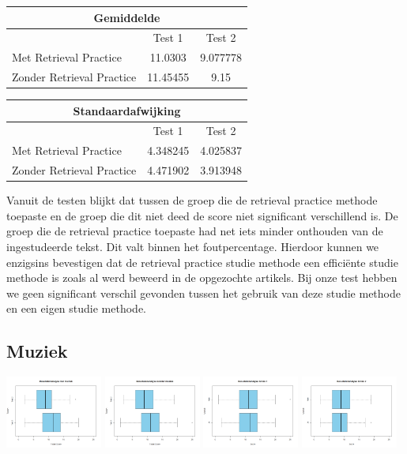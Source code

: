 \documentclass{hogent-article}
\begin{document}
	\begin{tabular}{ |p{10em}|c|c| }
		\hline
			\multicolumn{3}{|c|}{Gemiddelde} \\
		\hline
			& Test 1 & Test 2 \\
		\hline
			Met Retrieval Practice & 11.0303 & 9.077778 \\
			Zonder Retrieval Practice & 11.45455 & 9.15 \\
		\hline
	\end{tabular}

	\begin{tabular}{ |p{10em}|c|c| }
	\hline
		\multicolumn{3}{|c|}{Standaardafwijking} \\
	\hline
		& Test 1 & Test 2 \\
	\hline
		Met Retrieval Practice & 4.348245 & 4.025837 \\
		Zonder Retrieval Practice & 4.471902 & 3.913948 \\
	\hline
	\end{tabular}
	
	Vanuit de testen blijkt dat tussen de groep die de retrieval practice methode toepaste en de groep die dit niet deed de score niet significant verschillend is. De groep die de retrieval practice toepaste had net iets minder onthouden van de ingestudeerde tekst. Dit valt binnen het foutpercentage. Hierdoor kunnen we enzigsins bevestigen dat de retrieval practice studie methode een efficiënte studie methode is zoals al werd beweerd in de opgezochte artikels. Bij onze test hebben we geen significant verschil gevonden tussen het gebruik van deze studie methode en een eigen studie methode.
	
	\subsection{Muziek}
	\includegraphics[width=120px]{Rplot_MetMuziek}	
	\includegraphics[width=120px]{Rplot_ZonderMuziek}
	\includegraphics[width=120px]{Rplot_Muziek_Score1}
	\includegraphics[width=120px]{Rplot_Muziek_Score2}
	
\end{document}
